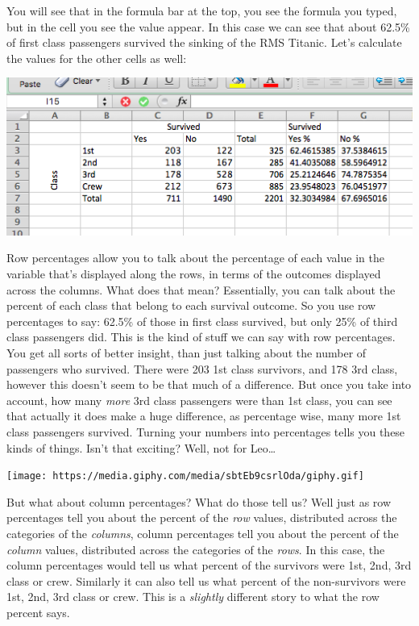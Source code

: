 \documentclass[
]{book}
\begin{document}
You will see that in the formula bar at the top, you see the formula you typed, but in the cell you see the value appear. In this case we can see that about 62.5\% of first class passengers survived the sinking of the RMS Titanic. Let's calculate the values for the other cells as well:

\includegraphics{imgs/all_row_perc.png}

Row percentages allow you to talk about the percentage of each value in the variable that's displayed along the rows, in terms of the outcomes displayed across the columns. What does that mean? Essentially, you can talk about the percent of each class that belong to each survival outcome. So you use row percentages to say: 62.5\% of those in first class survived, but only 25\% of third class passengers did. This is the kind of stuff we can say with row percentages. You get all sorts of better insight, than just talking about the number of passengers who survived. There were 203 1st class survivors, and 178 3rd class, however this doesn't seem to be that much of a difference. But once you take into account, how many \emph{more} 3rd class passengers were than 1st class, you can see that actually it does make a huge difference, as percentage wise, many more 1st class passengers survived. Turning your numbers into percentages tells you these kinds of things. Isn't that exciting? Well, not for Leo\ldots{}

\texttt{[image: https://media.giphy.com/media/sbtEb9csrlOda/giphy.gif]}

But what about column percentages? What do those tell us? Well just as row percentages tell you about the percent of the \emph{row} values, distributed across the categories of the \emph{columns}, column percentages tell you about the percent of the \emph{column} values, distributed across the categories of the \emph{rows}. In this case, the column percentages would tell us what percent of the survivors were 1st, 2nd, 3rd class or crew. Similarly it can also tell us what percent of the non-survivors were 1st, 2nd, 3rd class or crew. This is a \emph{slightly} different story to what the row percent says.
\end{document}

